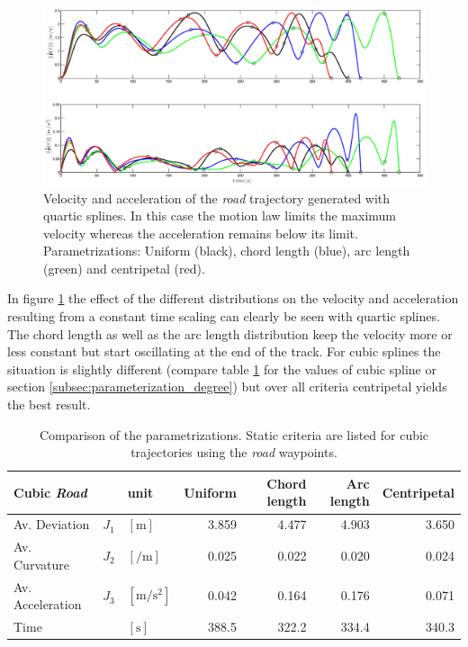 \begin{figure}[H]
	\centering
    \includegraphics[width = \textwidth]{graphics/Parameterization4_road_vel_acc.eps}
  \caption{Velocity and acceleration of the \textit{road} trajectory generated with quartic splines. In this case the motion law limits the maximum velocity whereas the acceleration remains below its limit. Parametrizations: Uniform (black), chord length (blue), arc length (green) and centripetal (red).}
  \label{fig:para road vel acc}
\end{figure}

In figure \ref{fig:para road vel acc} the effect of the different distributions on the velocity and acceleration resulting from a constant time scaling can clearly be seen with quartic splines. The chord length as well as the arc length distribution keep the velocity more or less constant but start oscillating at the end of the track. For cubic splines the situation is slightly different (compare table \ref{tab:results_parameterization_road_cubic} for the values of cubic spline or section \ref{subsec:parameterization_degree}) but over all criteria centripetal yields the best result.


\begin{table}[h]
\begin{center}
 \begin{tabular}{lll|rrrr}
 \hline
 Cubic \textit{Road} & & unit & Uniform & Chord length & Arc length & Centripetal \\ \hline \hline
 Av. Deviation  & $J_1$ & $[\si{\meter}]$    & 3.859 & 4.477 & 4.903 & 3.650 \\
 Av. Curvature & $J_2$ & $[\si{\per\meter}]$ & 0.025 & 0.022 & 0.020 & 0.024 \\
 Av. Acceleration  & $J_3$ & $[\si{\meter\per\square\second}]$ &  0.042 & 0.164 & 0.176 & 0.071 \\
 Time      &   & $[\si{\second}]$ &  388.5 & 322.2 & 334.4 & 340.3 \\
 \hline
 \end{tabular}
 \caption{Comparison of the parametrizations. Static criteria are listed for cubic trajectories using the \textit{road} waypoints.}\vspace{1ex}
 \label{tab:results_parameterization_road_cubic}
\end{center}
\end{table}

